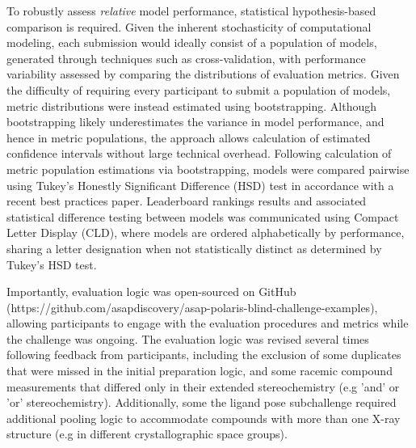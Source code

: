 \documentclass[journal=jcim,manuscript=article]{achemso}
\begin{document}
To robustly assess \textit{relative} model performance, statistical hypothesis-based comparison is required\cite{ash_practically_2024}. Given the inherent stochasticity of computational modeling, each submission would ideally consist of a population of models, generated through techniques such as cross-validation, with performance variability assessed by comparing the distributions of evaluation metrics. Given the difficulty of requiring every participant to submit a population of models, metric distributions were instead estimated using bootstrapping\cite{efron_bootstrap_1979}. Although bootstrapping likely underestimates the variance in model performance, and hence in metric populations, the approach allows calculation of estimated confidence intervals without large technical overhead. Following calculation of metric population estimations via bootstrapping, models were compared pairwise using Tukey's Honestly Significant Difference (HSD) test in accordance with a recent best practices paper\cite{ash_practically_2024}. Leaderboard rankings results and associated statistical difference testing between models was communicated using Compact Letter Display (CLD)\cite{cld_algorithm_2004}, where models are ordered alphabetically by performance, sharing a letter designation when not statistically distinct as determined by Tukey's HSD test. 

Importantly, evaluation logic was open-sourced on GitHub (https://github.com/asapdiscovery/asap-polaris-blind-challenge-examples), allowing participants to engage with the evaluation procedures and metrics while the challenge was ongoing. The evaluation logic was revised several times following feedback from participants, including the exclusion of some duplicates that were missed in the initial preparation logic, and some racemic compound measurements that differed only in their extended stereochemistry (e.g 'and' or 'or' stereochemistry). Additionally, some the ligand pose subchallenge required additional pooling logic to accommodate compounds with more than one X-ray structure (e.g in different crystallographic space groups). 
\end{document}
